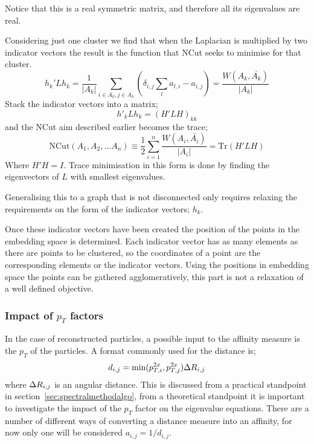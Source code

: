 Notice that this is a real symmetric matrix,
and therefore all its eigenvalues are real.

Considering just one cluster we find that when the Laplacian is multiplied by two indicator vectors
the result is the function that NCut seeks to minimise for that cluster.
\begin{equation}
    h_k'Lh_k = \frac{1}{|A_k|}\sum_{i \in A_k, j \in A_k} \left(\delta_{i, j}\sum_{l} a_{l, i} - a_{i, j} \right) = \frac{W(A_k, \bar{A_k})}{|A_k|}
\end{equation}
Stack the indicator vectors into a matrix;
\begin{equation} h'_k L h_k = (H'L H)_{kk}\end{equation}
and the NCut aim described earlier becomes the trace;
\begin{equation} \text{NCut}(A_1,A_2, \dots A_n) \equiv \frac{1}{2} \sum_{i=1}^n \frac{W(A_i, \bar{A_i})}{|A_i|} = \text{Tr}(H'LH)\end{equation}
Where \(H'H = I\).
Trace minimisation in this form is done
by finding the eigenvectors of \(L\) with smallest 
eigenvalues.

Generalising this to a graph that is not disconnected
only requires relaxing the requirements on the form of the indicator vectors; \(h_k\).

Once these indicator vectors have been created the position of the points in the embedding space is determined.
Each indicator vector has as many elements as there are points to be clustered,
so the coordinates of a point are the corresponding elements or the indicator vectors.
Using the positions in embedding space the points can be gathered agglomeratively,
this part is not a relaxation of a well defined objective.
\subsubsection{Impact of \(p_T\) factors}
In the case of reconstructed particles, a possible input to the affinity measure is the \(p_T\) of the particles.
A format commonly used for the distance is;
\begin{equation}d_{i,j} = \text{min}(p_{T,i}^{2x}, p_{T,j}^{2x}) \Delta R{}_{i,j}\end{equation}
where \(\Delta R{}_{i,j}\) is an angular distance.
This is discussed from a practical standpoint in section~\ref{sec:spectralmethodalgo},
from a theoretical standpoint it is important to investigate the impact of the \(p_T\) factor on the eigenvalue equations.
There are a number of different ways of converting a distance measure into an affinity,
for now only one will be considered \(a_{i,j} = 1/d_{i,j}\).

